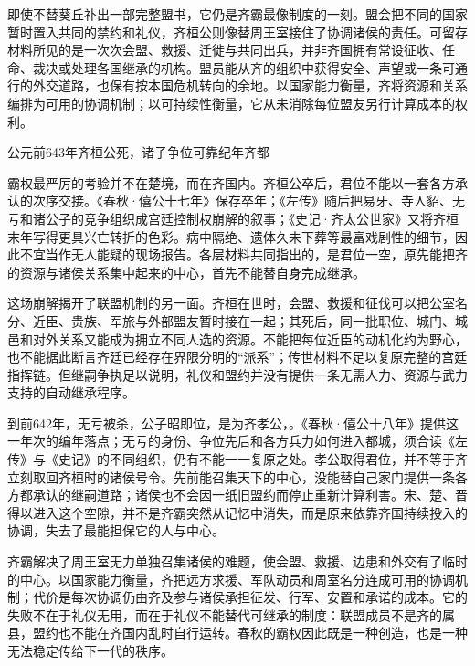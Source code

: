 

即使不替葵丘补出一部完整盟书，它仍是齐霸最像制度的一刻。盟会把不同的国家暂时置入共同的禁约和礼仪，齐桓公则像替周王室接住了协调诸侯的责任。可留存材料所见的是一次次会盟、救援、迁徙与共同出兵，并非齐国拥有常设征收、任命、裁决或处理各国继承的机构。盟员能从齐的组织中获得安全、声望或一条可通行的外交道路，也保有按本国危机转向的余地。以国家能力衡量，齐将资源和关系编排为可用的协调机制；以可持续性衡量，它从未消除每位盟友另行计算成本的权利。

\begin{event}{公元前643年}{齐桓公死，诸子争位}{可靠纪年}{齐都}

霸权最严厉的考验并不在楚境，而在齐国内。齐桓公卒后，君位不能以一套各方承认的次序交接。《春秋·僖公十七年》保存卒年；《左传》随后把易牙、寺人貂、无亏和诸公子的竞争组织成宫廷控制权崩解的叙事；《史记·齐太公世家》又将齐桓末年写得更具兴亡转折的色彩。病中隔绝、遗体久未下葬等最富戏剧性的细节，因此不宜当作无人能疑的现场报告。各层材料共同指出的，是君位一空，原先能把齐的资源与诸侯关系集中起来的中心，首先不能替自身完成继承。

这场崩解揭开了联盟机制的另一面。齐桓在世时，会盟、救援和征伐可以把公室名分、近臣、贵族、军旅与外部盟友暂时接在一起；其死后，同一批职位、城门、城邑和对外关系又能成为拥立不同人选的资源。不能把每位近臣的动机化约为野心，也不能据此断言齐廷已经存在界限分明的“派系”；传世材料不足以复原完整的宫廷指挥链。但继嗣争执足以说明，礼仪和盟约并没有提供一条无需人力、资源与武力支持的自动继承程序。
\end{event}

到前642年，无亏被杀，公子昭即位，是为齐孝公，。《春秋·僖公十八年》提供这一年次的编年落点；无亏的身份、争位先后和各方兵力如何进入都城，须合读《左传》与《史记》的不同组织，仍有不能一一复原之处。孝公取得君位，并不等于齐立刻取回齐桓时的诸侯号令。先前能召集天下的中心，没能替自己家门提供一条各方都承认的继嗣道路；诸侯也不会因一纸旧盟约而停止重新计算利害。宋、楚、晋得以进入这个空隙，并不是齐霸突然从记忆中消失，而是原来依靠齐国持续投入的协调，失去了最能担保它的人与中心。

\begin{turningpoint}
齐霸解决了周王室无力单独召集诸侯的难题，使会盟、救援、边患和外交有了临时的中心。以国家能力衡量，齐把远方求援、军队动员和周室名分连成可用的协调机制；代价是每次协调仍由齐及参与诸侯承担征发、行军、安置和承诺的成本。它的失败不在于礼仪无用，而在于礼仪不能替代可继承的制度：联盟成员不是齐的属县，盟约也不能在齐国内乱时自行运转。春秋的霸权因此既是一种创造，也是一种无法稳定传给下一代的秩序。
\end{turningpoint}

